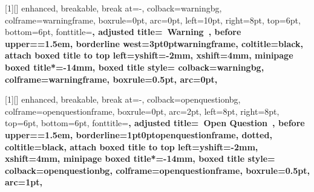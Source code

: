 
[1][]{%
  enhanced,
  breakable,
  break at=-\baselineskip,
  colback=warningbg,
  colframe=warningframe,
  boxrule=0pt,
  arc=0pt,
  left=10pt,
  right=8pt,
  top=6pt,
  bottom=6pt,
  fonttitle=\bfseries\sffamily,
  adjusted title={\warningicon~Warning~\thewarningcounter{}},
  before upper={\parindent=1.5em},
  borderline west={3pt}{0pt}{warningframe},
  coltitle=black,
  attach boxed title to top left={yshift=-2mm, xshift=4mm},
  minipage boxed title*=-14mm,
  boxed title style={
    colback=warningbg,
    colframe=warningframe,
    boxrule=0.5pt,
    arc=0pt,
      }
}


[1][]{%
  enhanced,
  breakable,
  break at=-\baselineskip,
  colback=openquestionbg,
  colframe=openquestionframe,
  boxrule=0pt,
  arc=2pt,
  left=8pt,
  right=8pt,
  top=6pt,
  bottom=6pt,
  fonttitle=\bfseries\sffamily,
  adjusted title={\openquestionicon~Open Question~\theopenquestioncounter{}},
  before upper={\parindent=1.5em},
  borderline={1pt}{0pt}{openquestionframe, dotted},
  coltitle=black,
  attach boxed title to top left={yshift=-2mm, xshift=4mm},
  minipage boxed title*=-14mm,
  boxed title style={
    colback=openquestionbg,
    colframe=openquestionframe,
    boxrule=0.5pt,
    arc=1pt,
      }
}


